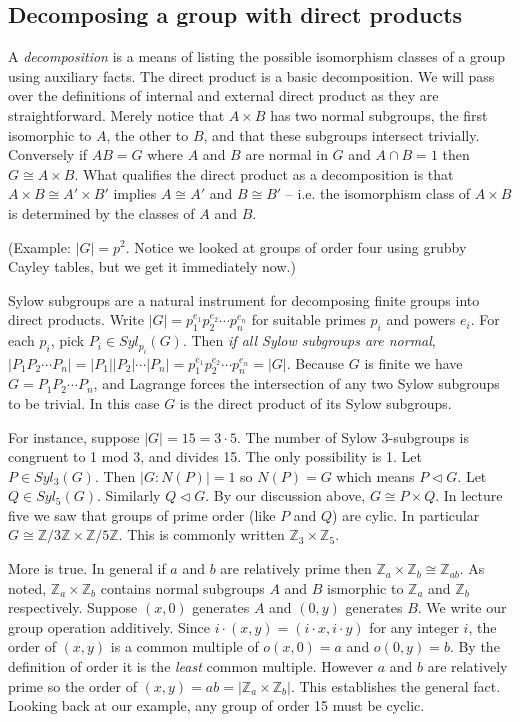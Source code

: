 \documentclass[letterpaper]{article}
\begin{document}
\subsection{Decomposing a group with direct products}

A \emph{decomposition} is a means of listing the possible isomorphism classes of a group using auxiliary facts. The direct product is a basic decomposition. We will pass over the definitions of internal and external direct product as they are straightforward. Merely notice that $A \times B$ has two normal subgroups, the first isomorphic to $A$, the other to $B$, and that these subgroups intersect trivially. Conversely if $AB = G$ where $A$ and $B$ are normal in $G$ and $A \cap B = 1$ then $G \cong A \times B$. What qualifies the direct product as a decomposition is that $A \times B \cong A' \times B'$ implies $A \cong A'$ and $B \cong B'$ -- i.e. the isomorphism class of $A \times B$ is determined by the classes of $A$ and $B$.

(Example: $|G| = p^2$. Notice we looked at groups of order four using grubby Cayley tables, but we get it immediately now.)

Sylow subgroups are a natural instrument for decomposing finite groups into direct products. Write $|G| = p_1^{e_1}p_2^{e_2}\cdots p_n^{e_n}$ for suitable primes $p_i$ and powers $e_i$. For each $p_i$, pick $P_i \in Syl_{p_i}(G)$. Then \emph{if all Sylow subgroups are normal}, $|P_1P_2\cdots P_n| = |P_1||P_2|\cdots |P_n| = p_1^{e_1}p_2^{e_2}\cdots p_n^{e_n} = |G|$. Because $G$ is finite we have $G = P_1P_2\cdots P_n$, and Lagrange forces the intersection of any two Sylow subgroups to be trivial. In this case $G$ is the direct product of its Sylow subgroups.

For instance, suppose $|G| = 15 = 3\cdot 5$. The number of Sylow 3-subgroups is congruent to 1 mod 3, and divides 15. The only possibility is 1. Let $P \in Syl_3(G)$. Then $|G \colon N(P)| = 1$ so $N(P) = G$ which means $P \lhd G$. Let $Q \in Syl_5(G)$. Similarly $Q \lhd G$. By our discussion above, $G \cong P \times Q$. In lecture five we saw that groups of prime order (like $P$ and $Q$) are cylic. In particular $G \cong \mathbb{Z}/3\mathbb{Z} \times \mathbb{Z}/5\mathbb{Z}$. This is commonly written $\mathbb{Z}_3 \times \mathbb{Z}_5$.

More is true. In general if $a$ and $b$ are relatively prime then $\mathbb{Z}_a \times \mathbb{Z}_b \cong \mathbb{Z}_{ab}$. As noted, $\mathbb{Z}_a \times \mathbb{Z}_b$ contains normal subgroups $A$ and $B$ ismorphic to $\mathbb{Z}_a$ and $\mathbb{Z}_b$ respectively. Suppose $(x, 0)$ generates $A$ and $(0, y)$ generates $B$. We write our group operation additively. Since $i \cdot (x, y) = (i \cdot x, i \cdot y)$ for any integer $i$, the order of $(x, y)$ is a common multiple of $o(x,0) = a$ and $o(0, y) = b$. By the definition of order it is the \emph{least} common multiple. However $a$ and $b$ are relatively prime so the order of $(x, y) = ab = |\mathbb{Z}_a \times \mathbb{Z}_b|$. This establishes the general fact. Looking back at our example, any group of order 15 must be cyclic.
\end{document}
